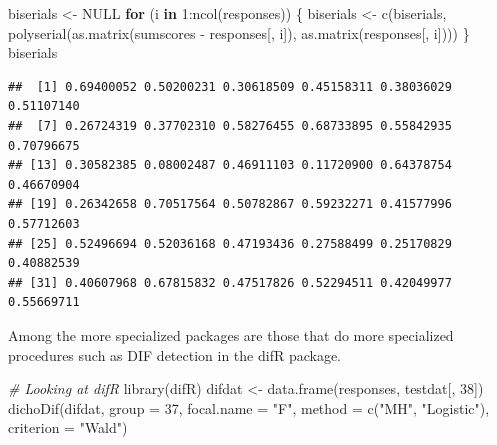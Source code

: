 \documentclass[
]{book}
\newenvironment{Shaded}{\begin{snugshade}}{\end{snugshade}}
\newcommand{\AttributeTok}[1]{\textcolor[rgb]{0.77,0.63,0.00}{#1}}
\newcommand{\CommentTok}[1]{\textcolor[rgb]{0.56,0.35,0.01}{\textit{#1}}}
\newcommand{\ConstantTok}[1]{\textcolor[rgb]{0.00,0.00,0.00}{#1}}
\newcommand{\ControlFlowTok}[1]{\textcolor[rgb]{0.13,0.29,0.53}{\textbf{#1}}}
\newcommand{\DecValTok}[1]{\textcolor[rgb]{0.00,0.00,0.81}{#1}}
\newcommand{\FunctionTok}[1]{\textcolor[rgb]{0.00,0.00,0.00}{#1}}
\newcommand{\NormalTok}[1]{#1}
\newcommand{\OtherTok}[1]{\textcolor[rgb]{0.56,0.35,0.01}{#1}}
\newcommand{\SpecialCharTok}[1]{\textcolor[rgb]{0.00,0.00,0.00}{#1}}
\newcommand{\StringTok}[1]{\textcolor[rgb]{0.31,0.60,0.02}{#1}}
\begin{document}
\begin{Shaded}
\begin{Highlighting}[]
\NormalTok{biserials }\OtherTok{\textless{}{-}} \ConstantTok{NULL}
\ControlFlowTok{for}\NormalTok{ (i }\ControlFlowTok{in} \DecValTok{1}\SpecialCharTok{:}\FunctionTok{ncol}\NormalTok{(responses)) \{}
\NormalTok{  biserials }\OtherTok{\textless{}{-}} \FunctionTok{c}\NormalTok{(biserials, }\FunctionTok{polyserial}\NormalTok{(}\FunctionTok{as.matrix}\NormalTok{(sumscores }\SpecialCharTok{{-}}\NormalTok{ responses[, i]), }\FunctionTok{as.matrix}\NormalTok{(responses[, i])))}
\NormalTok{\}}
\NormalTok{biserials}
\end{Highlighting}
\end{Shaded}

\begin{verbatim}
##  [1] 0.69400052 0.50200231 0.30618509 0.45158311 0.38036029 0.51107140
##  [7] 0.26724319 0.37702310 0.58276455 0.68733895 0.55842935 0.70796675
## [13] 0.30582385 0.08002487 0.46911103 0.11720900 0.64378754 0.46670904
## [19] 0.26342658 0.70517564 0.50782867 0.59232271 0.41577996 0.57712603
## [25] 0.52496694 0.52036168 0.47193436 0.27588499 0.25170829 0.40882539
## [31] 0.40607968 0.67815832 0.47517826 0.52294511 0.42049977 0.55669711
\end{verbatim}

Among the more specialized packages are those that do more specialized procedures such as DIF detection in the difR package.

\begin{Shaded}
\begin{Highlighting}[]
\CommentTok{\# Looking at difR}
\FunctionTok{library}\NormalTok{(difR)}
\NormalTok{difdat }\OtherTok{\textless{}{-}} \FunctionTok{data.frame}\NormalTok{(responses, testdat[, }\DecValTok{38}\NormalTok{])}
\FunctionTok{dichoDif}\NormalTok{(difdat, }\AttributeTok{group =} \DecValTok{37}\NormalTok{, }\AttributeTok{focal.name =} \StringTok{"F"}\NormalTok{, }\AttributeTok{method =} \FunctionTok{c}\NormalTok{(}\StringTok{"MH"}\NormalTok{, }\StringTok{"Logistic"}\NormalTok{), }\AttributeTok{criterion =} \StringTok{"Wald"}\NormalTok{)}
\end{Highlighting}
\end{Shaded}
\end{document}
